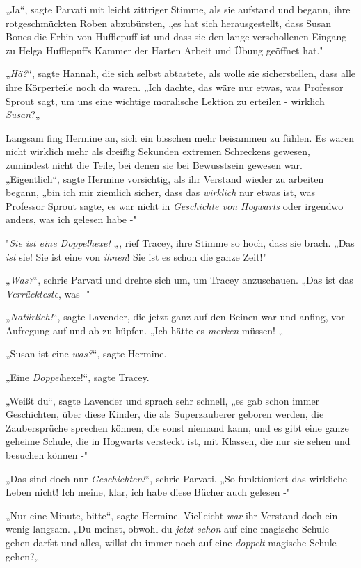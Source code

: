 {„Ja“, sagte Parvati mit leicht zittriger Stimme, als sie aufstand und begann, ihre rotgeschmückten Roben abzubürsten, „es hat sich herausgestellt, dass Susan Bones die Erbin von Hufflepuff ist und dass sie den lange verschollenen Eingang zu Helga Hufflepuffs Kammer der Harten Arbeit und Übung geöffnet hat."

„\emph{Hä?}“, sagte Hannah, die sich selbst abtastete, als wolle sie sicherstellen, dass alle ihre Körperteile noch da waren. „Ich dachte, das wäre nur etwas, was Professor Sprout sagt, um uns eine wichtige moralische Lektion zu erteilen - wirklich \emph{Susan}?„

Langsam fing Hermine an, sich ein bisschen mehr beisammen zu fühlen. Es waren nicht wirklich mehr als dreißig Sekunden extremen Schreckens gewesen, zumindest nicht die Teile, bei denen sie bei Bewusstsein gewesen war. „Eigentlich“, sagte Hermine vorsichtig, als ihr Verstand wieder zu arbeiten begann, „bin ich mir ziemlich sicher, dass das \emph{wirklich} nur etwas ist, was Professor Sprout sagte, es war nicht in \emph{Geschichte von Hogwarts} oder irgendwo anders, was ich gelesen habe -"

"\emph{Sie ist eine Doppelhexe!} „, rief Tracey, ihre Stimme so hoch, dass sie brach. „Das \emph{ist} sie! Sie ist eine von \emph{ihnen}! Sie ist es schon die ganze Zeit!"

„\emph{Was?}“, schrie Parvati und drehte sich um, um Tracey anzuschauen. „Das ist das \emph{Verrückteste}, was -"

„\emph{Natürlich!}“, sagte Lavender, die jetzt ganz auf den Beinen war und anfing, vor Aufregung auf und ab zu hüpfen. „Ich hätte es \emph{merken} müssen! „

„Susan ist eine \emph{was?}“, sagte Hermine.

„Eine \emph{Doppel}hexe!“, sagte Tracey.

„Weißt du“, sagte Lavender und sprach sehr schnell, „es gab schon immer Geschichten, über diese Kinder, die als Superzauberer geboren werden, die Zaubersprüche sprechen können, die sonst niemand kann, und es gibt eine ganze geheime Schule, die in Hogwarts versteckt ist, mit Klassen, die nur sie sehen und besuchen können -"

„Das sind doch nur \emph{Geschichten!}“, schrie Parvati. „So funktioniert das wirkliche Leben nicht! Ich meine, klar, ich habe diese Bücher auch gelesen -"

„Nur eine Minute, bitte“, sagte Hermine. Vielleicht \emph{war} ihr Verstand doch ein wenig langsam. „Du meinst, obwohl du \emph{jetzt schon} auf eine magische Schule gehen darfst und alles, willst du immer noch auf eine \emph{doppelt} magische Schule gehen?„

}
